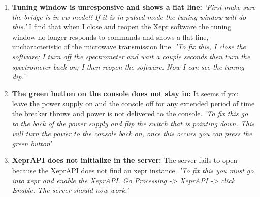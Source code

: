 \documentclass{article}
\newcommand{\fc}[1]{{\color{blue}\textit{'{#1}'}}}
\begin{document}
\begin{enumerate}
    \item {\bf Tuning window is unresponsive and shows a flat line:} \fc{First make sure the bridge is in cw mode!! If it is in pulsed mode the tuning window will do this.} I find that when I close and reopen the Xepr software the tuning window no longer responds to commands and shows a flat line, uncharacteristic of the microwave transmission line. \fc{To fix this, I close the software; I turn off the spectrometer and wait a couple seconds then turn the spectrometer back on; I then reopen the software. Now I can see the tuning dip.}

\item {\bf The green button on the console does not stay in:} It seems if you leave the power supply on and the console off for any extended period of time the breaker throws and power is not delivered to the console. \fc{To fix this go to the back of the power supply and flip the switch that is pointing down. This will turn the power to the console back on, once this occurs you can press the green button}

\item {\bf XeprAPI does not initialize in the server:} The server fails to open because the XeprAPI does not find an xepr instance. \fc{To fix this you must go into xepr and enable the XeprAPI. Go Processing -> XeprAPI -> click Enable. The server should now work.}

\end{enumerate}

{}

\end{document}

